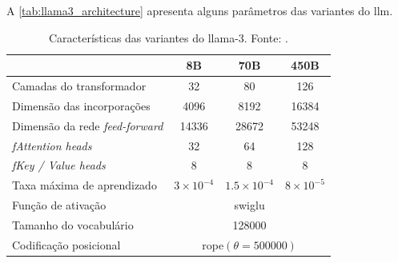 A \autoref{tab:llama3_architecture} apresenta alguns parâmetros das variantes do \ac{llm}.

\begin{table}[ht]
    \centering
    \begin{tabular}{l|ccc}
        \hline
                                               & 8B
                                               & 70B                                               & 450B
        \\ \hline
        Camadas do transformador               & 32
                                               & 80                                                & 126
        \\
        Dimensão das incorporações             & 4096
                                               & 8192                                              & 16384
        \\
        Dimensão da rede \textit{feed-forward} & 14336
                                               & 28672                                             & 53248
        \\
        \textit{fAttention heads}              & 32
                                               & 64                                                & 128
        \\
        \textit{fKey / Value heads}            & 8
                                               & 8                                                 & 8
        \\
        Taxa máxima de aprendizado             & \begin{math}3 \times 10^{-4}\end{math}
                                               & \begin{math}1.5 \times 10^{-4}\end{math}          & \begin{math}8
                                                                                                         \times

                                                                                                         10^{-5}\end{math} \\
        Função de ativação                     & \multicolumn{3}{c}{\ac{swiglu}}
        \\
        Tamanho do vocabulário                 & \multicolumn{3}{c}{128000}
        \\
        Codificação posicional                 & \multicolumn{3}{c}{\ac{rope}\begin{math}(\theta =
                                                                                 500000)\end{math}}
        \\ \hline
    \end{tabular}
    \label{tab:llama3_architecture}
    \caption{Características das variantes do \ac{llama}-3. Fonte: \textcite{dubey2024llama}.}
\end{table}

